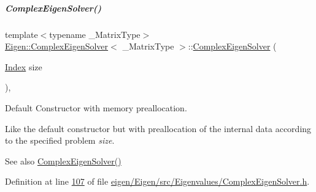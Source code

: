 \mbox{\label{group___eigenvalues___module_a86751f64ebcd5c554551fb5eaaa02db7}} 
\subparagraph{\texorpdfstring{Complex\+Eigen\+Solver()}{ComplexEigenSolver()}\hspace{0.1cm}{\footnotesize\ttfamily [2/6]}}
{\footnotesize\ttfamily template$<$typename \+\_\+\+Matrix\+Type$>$ \\
\hyperlink{group___eigenvalues___module_class_eigen_1_1_complex_eigen_solver}{Eigen\+::\+Complex\+Eigen\+Solver}$<$ \+\_\+\+Matrix\+Type $>$\+::\hyperlink{group___eigenvalues___module_class_eigen_1_1_complex_eigen_solver}{Complex\+Eigen\+Solver} (\begin{DoxyParamCaption}\item[{\hyperlink{group___eigenvalues___module_abc0218d8b902af0d6c759bfc0a8a8d74}{Index}}]{size }\end{DoxyParamCaption})\hspace{0.3cm}{\ttfamily [inline]}, {\ttfamily [explicit]}}



Default Constructor with memory preallocation. 

Like the default constructor but with preallocation of the internal data according to the specified problem {\itshape size}. \begin{DoxySeeAlso}{See also}
\hyperlink{group___eigenvalues___module_a3322a21574c61eefd450c003515ad802}{Complex\+Eigen\+Solver()} 
\end{DoxySeeAlso}


Definition at line \hyperlink{eigen_2_eigen_2src_2_eigenvalues_2_complex_eigen_solver_8h_source_l00107}{107} of file \hyperlink{eigen_2_eigen_2src_2_eigenvalues_2_complex_eigen_solver_8h_source}{eigen/\+Eigen/src/\+Eigenvalues/\+Complex\+Eigen\+Solver.\+h}.

